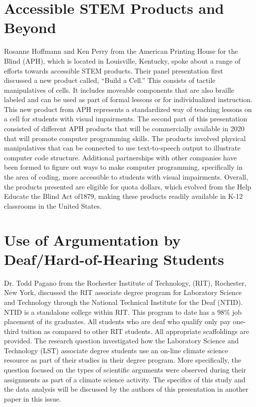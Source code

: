 \documentclass[11.5pt]{sig-alternate} %
\begin{document}
\begin{large}
\section*{Accessible STEM Products and Beyond}
Rosanne Hoffmann and Ken Perry from the American Printing House for the Blind (APH), which is located in Louisville, Kentucky, spoke about a range of efforts towards accessible STEM products.  Their panel presentation first discussed a new product called, “Build a Cell.” This consists of tactile manipulatives of cells. It includes moveable components that are also braille labeled and can be used as part of formal lessons or for individualized instruction. This new product from APH represents a standardized way of teaching lessons on a cell for students with visual impairments. The second part of this presentation consisted of different APH products that will be commercially available in 2020 that will promote computer programming skills. The products involved physical manipulatives that can be connected to use text-to-speech output to illustrate computer code structure. Additional partnerships with other companies have been formed to figure out ways to make computer programming, specifically in the area of coding, more accessible to students with visual impairments. Overall, the products presented are eligible for quota dollars, which evolved from the Help Educate the Blind Act of1879, making these products readily available in K-12 classrooms in the United States.


\section*{Use of Argumentation by Deaf/Hard-of-Hearing Students}
Dr. Todd Pagano from the Rochester Institute of Technology, (RIT), Rochester, New York, discussed the RIT associate degree program for Laboratory Science and Technology through the National Technical Institute for the Deaf (NTID). NTID is a standalone college within RIT. This program to date has a 98\% job placement of its graduates. All students who are deaf who qualify only pay one-third tuition as compared to other RIT students. All appropriate scaffoldings are provided. The research question investigated how the Laboratory Science and Technology (LST) associate degree students use an on-line climate science resource as part of their studies in their degree program.  More specifically, the question focused on the types of scientific arguments were observed during their assignments as part of a climate science activity. The specifics of this study and the data analysis will be discussed by the authors of this presentation in another paper in this issue. 



\end{large}
\end{document}
